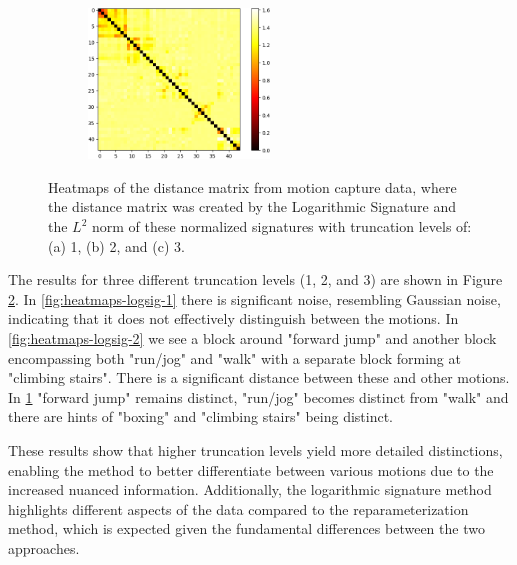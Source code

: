 \begin{figure}
\begin{subfigure}{\textwidth}
    \end{subfigure}
    \begin{subfigure}{\textwidth}
        \centering
        \includegraphics[width=0.53\textwidth]{figures/motion-capture-data/heatmaps/logsig_3.png}
        \caption{}
        \label{fig:heatmaps-logsig-3}
    \end{subfigure}
    \caption[Heatmap: Motion Capture Data Classification utilizing Logarithmic Signature]{Heatmaps of the distance matrix from motion capture data, where the distance matrix was created by the Logarithmic Signature and the \(L^2\) norm of these normalized signatures with truncation levels of: (a) 1, (b) 2, and (c) 3.}
    \label{fig:heatmaps-logsig}
\end{figure}

The results for three different truncation levels (1, 2, and 3) are shown in Figure \ref{fig:heatmaps-logsig}. In \ref{fig:heatmaps-logsig-1} there is significant noise, resembling Gaussian noise, indicating that it does not effectively distinguish between the motions. In \ref{fig:heatmaps-logsig-2} we see a block around "forward jump" and another block encompassing both "run/jog" and "walk" with a separate block forming at "climbing stairs". There is a significant distance between these and other motions. In \ref{fig:heatmaps-logsig-3} "forward jump" remains distinct, "run/jog" becomes distinct from "walk" and there are hints of "boxing" and "climbing stairs" being distinct.

These results show that higher truncation levels yield more detailed distinctions, enabling the method to better differentiate between various motions due to the increased nuanced information. Additionally, the logarithmic signature method highlights different aspects of the data compared to the reparameterization method, which is expected given the fundamental differences between the two approaches.